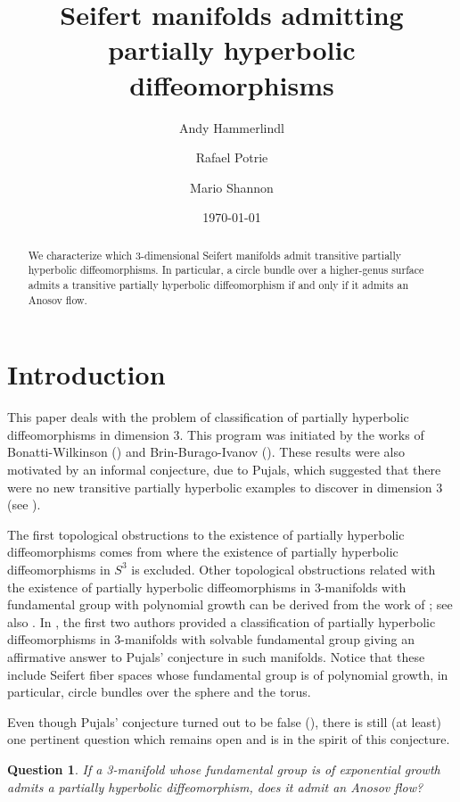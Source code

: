 \documentclass[11pt]{amsart} %
\author[A. Hammerlindl]{Andy Hammerlindl}
\author[R. Potrie]{Rafael Potrie}
\author[M. Shannon]{Mario Shannon}
\title[Seifert manifolds admitting partially hyperbolic diffeomorphisms]{Seifert manifolds admitting partially hyperbolic diffeomorphisms}
\date{\today}
\numberwithin{equation}{section}
\newtheorem{quest}{Question}
\theoremstyle{remark}
\begin{document}
\maketitle


%

%

\begin{abstract}
We characterize which 3-dimensional Seifert manifolds admit transitive
partially hyperbolic diffeomorphisms.
In particular, a circle bundle over a higher-genus surface
admits a transitive partially hyperbolic diffeomorphism
if and only if it admits an Anosov flow.
\end{abstract}


\section{Introduction}\label{SectionIntroduccion}
This paper deals with the problem of classification of partially hyperbolic diffeomorphisms in dimension 3. This program was initiated by the works of Bonatti-Wilkinson (\cite{BonattiWilkinson}) and Brin-Burago-Ivanov (\cite{BBI}). These results were also motivated by an informal conjecture, due to Pujals, which suggested that there were no new transitive partially hyperbolic examples to discover in dimension 3 (see \cite{BonattiWilkinson,CHHU,HP-Survey}).  

The first topological obstructions to the existence of partially hyperbolic diffeomorphisms comes from \cite{BI} where the existence of partially hyperbolic diffeomorphisms in $S^3$ is excluded. Other topological obstructions related with the existence of partially hyperbolic diffeomorphisms in 3-manifolds with fundamental group with polynomial growth can be derived from the work of \cite{BI}; see also \cite{Parwani}. In \cite{HPNil,HPSol}, the first two authors provided a classification of partially hyperbolic diffeomorphisms in 3-manifolds with solvable fundamental group giving an affirmative answer to Pujals' conjecture in such manifolds. Notice that these include Seifert fiber spaces whose fundamental group is of polynomial growth, in particular, circle bundles over the sphere and the torus.


Even though Pujals' conjecture turned out to be false (\cite{BPP,BGP,BGHP}), there is still (at least) one pertinent question which remains open and is in the spirit of this conjecture. 


\begin{quest}
If a 3-manifold whose fundamental group is of exponential growth admits a partially hyperbolic diffeomorphism, does it admit an Anosov flow? 
\end{quest}
\end{document}
